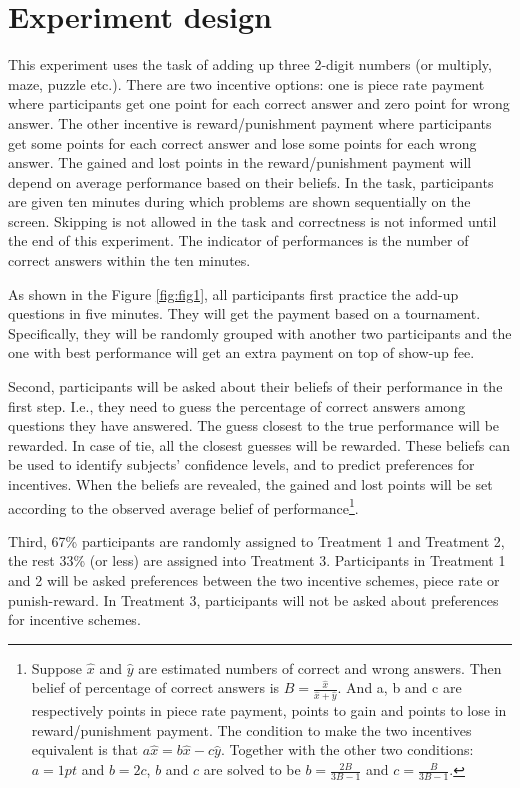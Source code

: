 \documentclass[12pt]{article}
\begin{document}
\section{Experiment design}

This experiment uses the task of adding up three 2-digit numbers (or multiply, maze, puzzle etc.). There are two incentive options: one is piece rate payment where participants get one point for each correct answer and zero point for wrong answer. The other incentive is reward/punishment payment where participants get some points for each correct answer and lose some points for each wrong answer. The gained and lost points in the reward/punishment payment will depend on average performance based on their beliefs. In the task, participants are given ten minutes during which problems are shown sequentially on the screen. Skipping is not allowed in the task and correctness is not informed until the end of this experiment. The indicator of performances is the number of correct answers within the ten minutes.

As shown in the Figure \ref{fig:fig1}, all participants first practice the add-up questions in five minutes. They will get the payment based on a tournament. Specifically, they will be randomly grouped with another two participants and the one with best performance will get an extra payment on top of show-up fee.

Second, participants will be asked about their beliefs of their performance in the first step. I.e., they need to guess the percentage of correct answers among questions they have answered. The guess closest to the true performance will be rewarded. In case of tie, all the closest guesses will be rewarded. These beliefs can be used to identify subjects' confidence levels, and to predict preferences for incentives. When the beliefs are revealed, the gained and lost points will be set according to the observed average belief of performance\footnote{Suppose $\hat{x}$ and $\hat{y}$ are estimated numbers of correct and wrong answers. Then belief of percentage of correct answers is $B=\frac{\hat{x}}{\hat{x}+\hat{y}}$. And a, b and c are respectively points in piece rate payment, points to gain and points to lose in reward/punishment payment. The condition to make the two incentives equivalent is that $a\hat{x}=b\hat{x}-c\hat{y}$. Together with the other two conditions: $a=1pt$ and $b=2c$, $b$ and $c$ are solved to be $b=\frac{2B}{3B-1}$ and $c=\frac{B}{3B-1}$.}.

Third, 67\% participants are randomly assigned to Treatment 1 and Treatment 2, the rest 33\% (or less) are assigned into Treatment 3. Participants in Treatment 1 and 2 will be asked preferences between the two incentive schemes, piece rate or punish-reward. In Treatment 3, participants will not be asked about preferences for incentive schemes. 
\end{document}
